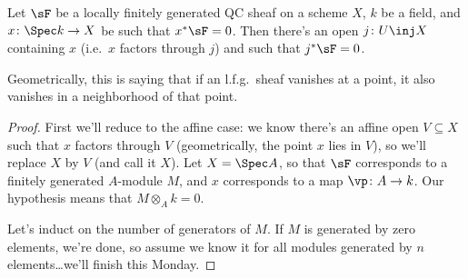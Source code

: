 \begin{thm}
\label{nakayama}
Let $\sF$ be a locally finitely generated QC sheaf on a scheme $X$, $k$ be a field, and $x\colon \Spec k\to X$ be
such that $x^*\sF = 0$. Then there's an open $j\colon U\inj X$ containing $x$ (i.e.\ $x$ factors through $j$) and
such that $j^*\sF = 0$.
\end{thm}
Geometrically, this is saying that if an l.f.g.\ sheaf vanishes at a point, it also vanishes in a neighborhood of
that point.
\begin{proof}
First we'll reduce to the affine case: we know there's an affine open $V\subseteq X$ such that $x$ factors through
$V$ (geometrically, the point $x$ lies in $V$), so we'll replace $X$ by $V$ (and call it $X$). Let $X = \Spec A$,
so that $\sF$ corresponds to a finitely generated $A$-module $M$, and $x$ corresponds to a map $\vp\colon A\to k$.
Our hypothesis means that $M\otimes_A k = 0$.

Let's induct on the number of generators of $M$. If $M$ is generated by zero elements, we're done, so assume we
know it for all modules generated by $n$ elements\dots we'll finish this Monday.
\end{proof}

